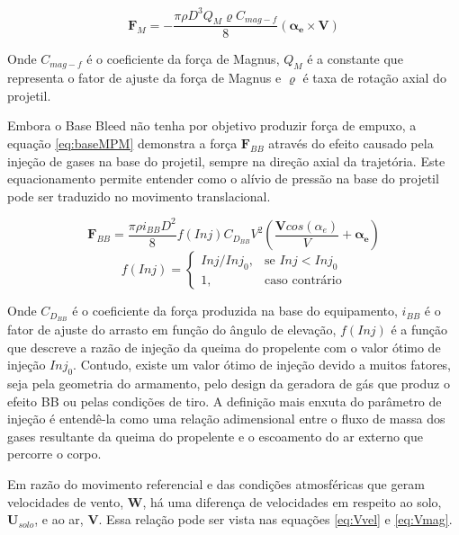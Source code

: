\begin{equation}
    \label{eq:magnusMPM}
    \boldsymbol{F}_{M} = -\frac{\pi \rho D^{3} Q_{M} \varrho C_{mag-f}}{8}(\boldsymbol{\alpha_{e}} \times \boldsymbol{V})
\end{equation}

Onde $C_{mag-f}$ é o coeficiente da força de Magnus, $Q_{M}$ é a constante que representa o fator de ajuste da força de Magnus e $\varrho$ é taxa de rotação axial do projetil.

Embora o Base Bleed não tenha por objetivo produzir força de empuxo, a equação \ref{eq:baseMPM} demonstra a força $\textbf{F}_{BB}$ através do efeito causado pela injeção de gases na base do projetil, sempre na direção axial da trajetória. Este equacionamento permite entender como o alívio de pressão na base do projetil pode ser traduzido no movimento translacional.

\begin{equation} \label{eq:baseMPM}
    \boldsymbol{F}_{BB} = \frac{\pi \rho i_{BB} D^{2}}{8} f(Inj) C_{D_{BB}}V^{2} \left(\frac{\boldsymbol{V}cos(\alpha_{e})}{V} +\boldsymbol{\alpha_{e}}\right)
\end{equation}
%
\begin{equation}
f(Inj) =\begin{cases}
			Inj/Inj_{0}, & \text{se $Inj < Inj_{0}$}\\
            1, & \text{caso contrário}
		 \end{cases}
\end{equation}

Onde $C_{D_{BB}}$ é o coeficiente da força produzida na base do equipamento, $i_{BB}$ é o fator de ajuste do arrasto em função do ângulo de elevação, $f(Inj)$ é a função que descreve a razão de injeção da queima do propelente com o valor ótimo de injeção $Inj_{0}$. Contudo, existe um valor ótimo de injeção devido a muitos fatores, seja pela geometria do armamento, pelo design da geradora de gás que produz o efeito BB ou pelas condições de tiro. A definição mais enxuta do parâmetro de injeção é entendê-la como uma relação adimensional entre o fluxo de massa dos gases resultante da queima do propelente e o escoamento do ar externo que percorre o corpo.

Em razão do movimento referencial e das condições atmosféricas que geram velocidades de vento, $\boldsymbol{W}$, há uma diferença de velocidades em respeito ao solo, $\boldsymbol{U}_{solo}$, e ao ar, $\boldsymbol{V}$. Essa relação pode ser vista nas equações \ref{eq:Vvel} e \ref{eq:Vmag}.

